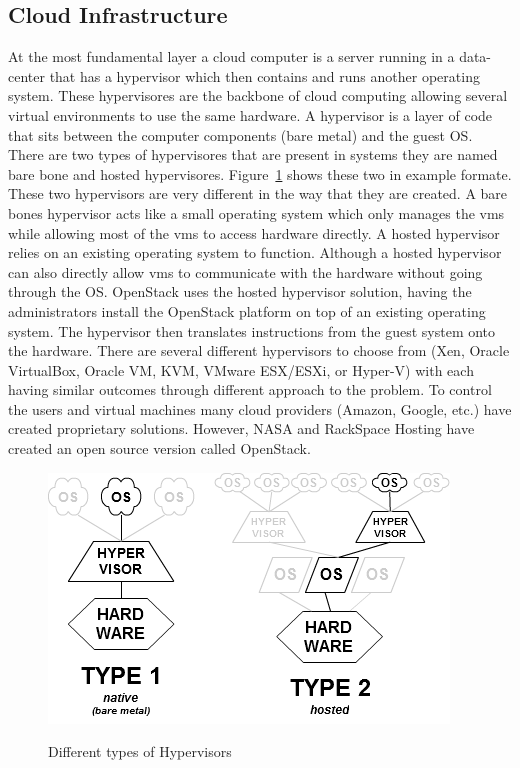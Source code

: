 \documentclass[12pt]{article}
\begin{document}
\subsection{Cloud Infrastructure}
At the most fundamental layer a cloud computer is a server running in a data-center that has a hypervisor which then contains and runs another operating system. These hypervisores are the backbone of cloud computing allowing several virtual environments to use the same hardware. A hypervisor is a layer of code that sits between the computer components (bare metal) and the guest OS\@. There are two types of hypervisores that are present in systems they are named bare bone and hosted hypervisores. Figure~\ref{fig:Hypervisors} shows these two in example formate. These two hypervisors are very different in the way that they are created.  A bare bones hypervisor acts like a small operating system which only manages the vms while allowing most of the vms to access hardware directly. A hosted hypervisor relies on an existing operating system to function. Although a hosted hypervisor can also directly allow vms to communicate with the hardware without going through the OS\@. OpenStack uses the hosted hypervisor solution, having the administrators install the OpenStack platform on top of an existing operating system.   The hypervisor then translates instructions from the guest system onto the hardware. There are several different hypervisors to choose from (Xen, Oracle VirtualBox, Oracle VM, KVM, VMware ESX/ESXi, or Hyper-V) with each having similar outcomes through different approach to the problem. To control the users and virtual machines many cloud providers (Amazon, Google, etc.) have created proprietary solutions. However, NASA and RackSpace Hosting \cite{wikipedia1} have created an open source version called OpenStack.

\begin{figure}[H]
    \caption{Different types of Hypervisors}
    \centering
    \includegraphics[scale=.8]{./pic/Hyperviseur.png}
    \label{fig:Hypervisors}
\end{figure}
\end{document}
